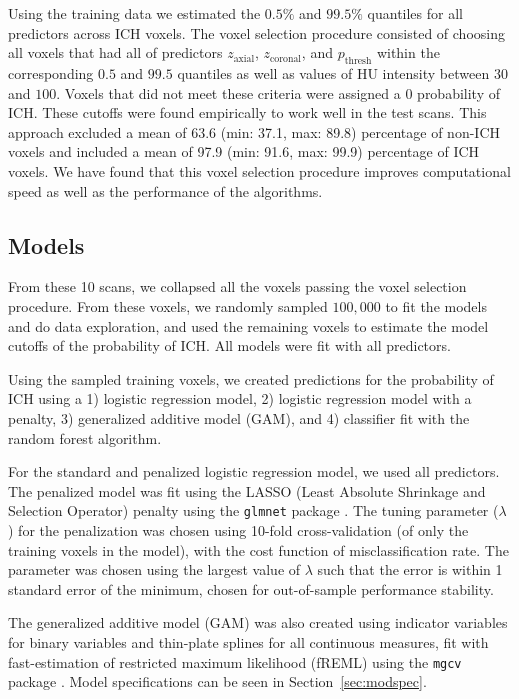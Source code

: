 \documentclass{elsarticle_nonatbib}\usepackage[]{graphicx}\usepackage[]{color}
\newcommand{\pkg}[1]{\texttt{#1}}
\begin{document}
Using the training data we estimated the $0.5\%$ and $99.5\%$ quantiles for all predictors across ICH voxels. The voxel selection procedure consisted of choosing all voxels that had all of predictors $z_{\text{axial}}$, $z_{\text{coronal}}$, and $p_{\text{thresh}}$ within the corresponding $0.5$ and $99.5$ quantiles as well as values of HU intensity between $30$ and $100$. Voxels that did not meet these criteria were assigned a $0$ probability of ICH. These cutoffs were found empirically to work well in the test scans. This approach excluded a mean of  63.6 (min: 37.1, max: 89.8) percentage of non-ICH voxels and included a mean of 97.9 (min: 91.6, max: 99.9) percentage of ICH voxels.  We have found that this voxel selection procedure improves computational speed as well as the performance of the algorithms.  

\subsection{Models}

From these 10 scans, we collapsed all the voxels passing the voxel selection procedure.  From these voxels, we randomly sampled $100{,}000$ to fit the models and do data exploration, and used the remaining voxels to estimate the model cutoffs of the probability of ICH.   All models were fit with all predictors.  


Using the sampled training voxels, we created predictions for the probability of ICH using a 1) logistic regression model, 2) logistic regression model with a penalty, 3) generalized additive model (GAM), and 4) classifier fit with the random forest algorithm.

For the standard and penalized logistic regression model, we used all predictors.  The penalized model was fit using the LASSO (Least Absolute Shrinkage and Selection Operator) penalty \citep{tibshirani_regression_1996} using the \pkg{glmnet} package \citep{friedman_regularization_2010}.  The tuning parameter ($\lambda$) for the penalization was chosen using 10-fold cross-validation (of only the training voxels in the model), with the cost function of misclassification rate.  The parameter was chosen using the largest value of $\lambda$ such that the error is within 1 standard error of the minimum, chosen for out-of-sample performance stability.

The generalized additive model (GAM) \citep{hastie_generalized_1986, hastie_generalized_1990} was also created using indicator variables for binary variables and thin-plate splines for all continuous measures, fit with fast-estimation of restricted maximum likelihood (fREML) using the \pkg{mgcv} package \citep{wood_fast_2011, wood_generalized_2015}.   Model specifications can be seen in Section~\ref{sec:modspec}.
\end{document}
